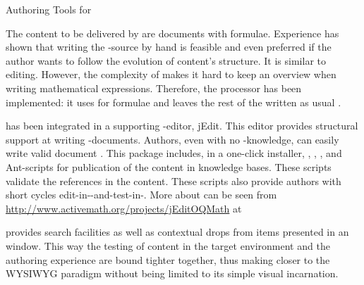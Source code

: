 
\begin{omgroup}[id=jeditoqmath,creators=libbrecht]{Authoring Tools for {\activemath}}


The {\omdoc} content to be delivered by {\activemath} are {\omdoc} documents with
{\openmath} formulae. Experience has shown that writing the {\xml}-source by hand is
feasible and even preferred if the author wants to follow the evolution of content's
structure.  It is similar to {\html} editing.  However, the complexity of {\xml} makes it
hard to keep an overview when writing mathematical expressions. Therefore, the
{} processor has been implemented: it uses {} for formulae and
leaves the rest of the {\omdoc} written as usual {\xml}.

{} has been integrated in a supporting {\xml}-editor, jEdit. This editor
provides structural support at writing {\xml}-documents. Authors, even with no
{\xml}-knowledge, can easily write valid document {}.  This package
includes, in a one-click installer, {\qmath}, {}, {}, and
Ant-scripts for publication of the content in {\activemath} knowledge bases.  These
scripts validate the references in the content.  These scripts also provide authors with
short cycles edit-in-{}-and-test-in-{\activemath}.  More about
{} can be seen from
{\url{http://www.activemath.org/projects/jEditOQMath}} at~\cite{AM-authoring-from-dev-on}


{} provides search facilities as well as contextual drops from items
presented in an {\activemath} window.  This way the testing of content in the target
environment and the authoring experience are bound tighter together,
thus making {} closer to the WYSIWYG paradigm without being limited to
its simple visual incarnation.


\end{omgroup}
